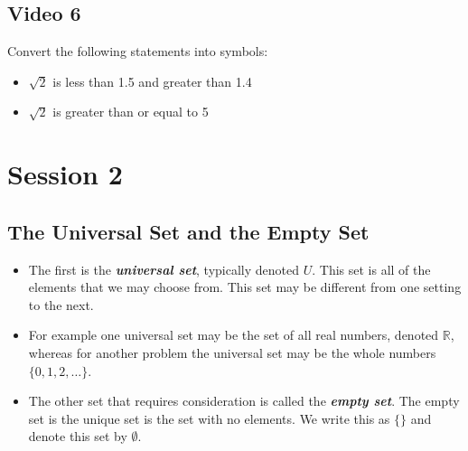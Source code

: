 \documentclass[]{report}
\begin{document}
\begin{enumerate}
\section{Video 6}


Convert the following statements into symbols:

\begin{itemize}
\item $\sqrt{2}$ is less than 1.5 and greater than 1.4
\item $\sqrt{2}$ is greater than or equal to 5
\end{itemize}



\chapter{Session 2}
\section*{The Universal Set and the Empty Set}
\begin{itemize}
\item The first is the \textbf{\textit{universal set}}, typically denoted $U$. This set is all of the elements that we may choose from. This set may be different from one setting to the next. 

\item For example one universal set may be the set of all real numbers, denoted $\mathbb{R}$, whereas for another problem the universal set may be the whole numbers $\{0, 1, 2,\ldots\}$.

\item The other set that requires consideration is called the \textit{\textbf{empty set}}. The empty set is the unique set is the set with no elements. We write this as $\{ \}$ and denote this set by $\emptyset$.
\end{itemize}

\end{enumerate}
\end{document}
